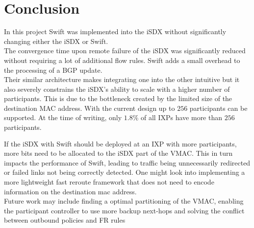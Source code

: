 \chapter{\label{chapter7}Conclusion}
In this project Swift was implemented into the iSDX without significantly changing either the iSDX or Swift.\\
The convergence time upon remote failure of the iSDX was significantly reduced without requiring a lot of additional flow rules. Swift adds a small overhead to the processing of a BGP update. \\
Their similar architecture makes integrating one into the other intuitive but it also severely constrains the iSDX's ability to scale with a higher number of participants. This is due to the bottleneck created by the limited size of the destination MAC address. With the current design up to $256$ participants can be supported. At the time of writing, only $1.8\%$ of all IXPs have more than $256$ participants. \cite{ixps} 


If the iSDX with Swift should be deployed at an IXP with more participants, more bits need to be allocated to the iSDX part of the VMAC. This in turn impacts the performance of Swift, leading to traffic being unnecessarily redirected or failed links not being correctly detected. One might look into implementing a more lightweight fast reroute framework that does not need to encode information on the destination mac address. \\
Future work may include finding a optimal partitioning of the VMAC, enabling the participant controller to use more backup next-hops and solving the conflict between outbound policies and FR rules